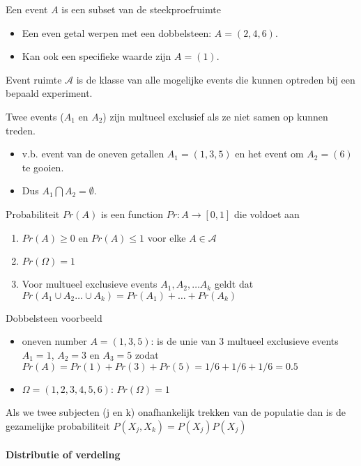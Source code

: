 \documentclass[
  12pt,dutch,coursenotes]{book}
\providecommand{\tightlist}{%
  \setlength{\itemsep}{0pt}\setlength{\parskip}{0pt}}
\theoremstyle{definition}
\theoremstyle{definition}
\theoremstyle{definition}
\theoremstyle{remark}
\begin{document}
Een event \(A\) is een subset van de steekproefruimte

\begin{itemize}
\tightlist
\item
  Een even getal werpen met een dobbelsteen: \(A=(2,4,6)\).
\item
  Kan ook een specifieke waarde zijn \(A=(1)\).
\end{itemize}

Event ruimte \(\mathcal{A}\) is de klasse van alle mogelijke events die kunnen optreden bij een bepaald experiment.

Twee events (\(A_1\) en \(A_2\)) zijn multueel exclusief als ze niet samen op kunnen treden.

\begin{itemize}
\tightlist
\item
  v.b. event van de oneven getallen \(A_1=(1,3,5)\) en het event om \(A_2=(6)\) te gooien.
\item
  Dus \(A_1 \bigcap A_2=\emptyset\).
\end{itemize}

Probabiliteit \(Pr(A)\) is een function \(Pr: A \rightarrow [0,1]\) die voldoet aan

\begin{enumerate}
\def\labelenumi{\arabic{enumi}.}
\tightlist
\item
  \(Pr(A) \geq 0\) en \(Pr(A) \leq 1\) voor elke \(A \in \mathcal{A}\)
\item
  \(Pr(\Omega)=1\)
\item
  Voor multueel exclusieve events \(A_1, A_2, \ldots A_k\) geldt dat \(Pr(A_1 \cup A_2 \ldots \cup A_k)= Pr(A_1) + \ldots + Pr(A_k)\)
\end{enumerate}

Dobbelsteen voorbeeld

\begin{itemize}
\tightlist
\item
  oneven number \(A=(1,3,5)\): is de unie van 3 multueel exclusieve events \(A_1=1\), \(A_2=3\) en \(A_3=5\) zodat
  \(Pr(A)=Pr(1)+Pr(3)+Pr(5)=1/6+1/6+1/6=0.5\)
\item
  \(\Omega=(1,2,3,4,5,6)\): \(Pr(\Omega)=1\)
\end{itemize}

Als we twee subjecten (j en k) onafhankelijk trekken van de populatie dan is de gezamelijke probabiliteit
\(P(X_j,X_k)= P(X_j)P(X_j)\)

\hypertarget{distributie-of-verdeling}{%
\paragraph{Distributie of verdeling}\label{distributie-of-verdeling}}
\end{document}
